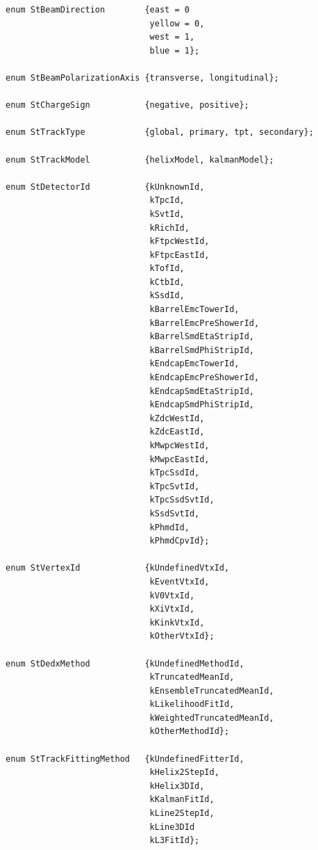 \documentclass[twoside]{article}
\begin{document}
\begin{verbatim}
enum StBeamDirection        {east = 0
                             yellow = 0,
                             west = 1,
                             blue = 1};

enum StBeamPolarizationAxis {transverse, longitudinal};

enum StChargeSign           {negative, positive};

enum StTrackType            {global, primary, tpt, secondary};

enum StTrackModel           {helixModel, kalmanModel};

enum StDetectorId           {kUnknownId,
                             kTpcId,
                             kSvtId,
                             kRichId,
                             kFtpcWestId,
                             kFtpcEastId,
                             kTofId,
                             kCtbId,
                             kSsdId,
                             kBarrelEmcTowerId,
                             kBarrelEmcPreShowerId,
                             kBarrelSmdEtaStripId,
                             kBarrelSmdPhiStripId,
                             kEndcapEmcTowerId,
                             kEndcapEmcPreShowerId,
                             kEndcapSmdEtaStripId,
                             kEndcapSmdPhiStripId,
                             kZdcWestId,
                             kZdcEastId,
                             kMwpcWestId,
                             kMwpcEastId,
                             kTpcSsdId,
                             kTpcSvtId,
                             kTpcSsdSvtId,
                             kSsdSvtId,
                             kPhmdId,
                             kPhmdCpvId};

enum StVertexId             {kUndefinedVtxId,
                             kEventVtxId,
                             kV0VtxId,
                             kXiVtxId,
                             kKinkVtxId,
                             kOtherVtxId};

enum StDedxMethod           {kUndefinedMethodId,
                             kTruncatedMeanId,
                             kEnsembleTruncatedMeanId,
                             kLikelihoodFitId,
                             kWeightedTruncatedMeanId,
                             kOtherMethodId};
           
enum StTrackFittingMethod   {kUndefinedFitterId,
                             kHelix2StepId,
                             kHelix3DId,
                             kKalmanFitId,
                             kLine2StepId,
                             kLine3DId
                             kL3FitId};


\end{verbatim}
\end{document}
